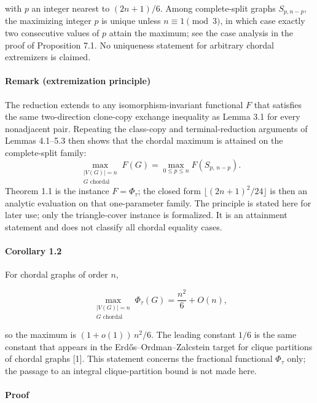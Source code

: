 \documentclass[english,11pt,a4paper]{article}
\begin{document}
with \(p\) an integer nearest to \((2n+1)/6\). Among complete-split
graphs \(S_{p,n-p}\), the maximizing integer \(p\) is unique unless
\(n\equiv1\pmod3\), in which case exactly two consecutive values of
\(p\) attain the maximum; see the case analysis in the proof of
Proposition 7.1. No uniqueness statement for arbitrary chordal
extremizers is claimed.

\paragraph{Remark (extremization
principle)}\label{remark-extremization-principle}

The reduction extends to any isomorphism-invariant functional \(F\) that
satisfies the same two-direction clone-copy exchange inequality as Lemma
3.1 for every nonadjacent pair. Repeating the class-copy and
terminal-reduction arguments of Lemmas 4.1--5.3 then shows that the
chordal maximum is attained on the complete-split family: \[
\max_{\substack{|V(G)|=n\\ G\text{ chordal}}}F(G)=\max_{0\le p\le n}F(S_{p,\,n-p}).
\] Theorem 1.1 is the instance \(F=\Phi_\tau\); the closed form
\(\lfloor(2n+1)^2/24\rfloor\) is then an analytic evaluation on that
one-parameter family. The principle is stated here for later use; only
the triangle-cover instance is formalized. It is an attainment statement
and does not classify all chordal equality cases.

\paragraph{Corollary 1.2}\label{corollary-1.2}

For chordal graphs of order \(n\),

\[
\max_{\substack{|V(G)|=n\\G\text{ chordal}}}\Phi_\tau(G)=\frac{n^2}{6}+O(n),
\]

so the maximum is \((1+o(1))\,n^2/6\). The leading constant \(1/6\) is
the same constant that appears in the Erdős--Ordman--Zalcstein target
for clique partitions of chordal graphs {[}1{]}. This statement concerns
the fractional functional \(\Phi_\tau\) only; the passage to an integral
clique-partition bound is not made here.

\paragraph{Proof}\label{proof}
\end{document}
